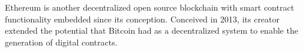 Ethereum is another decentralized open source blockchain with smart contract functionality embedded since its conception. Conceived in 2013, its creator extended the potential that Bitcoin had as a decentralized system to enable the generation of digital contracts.